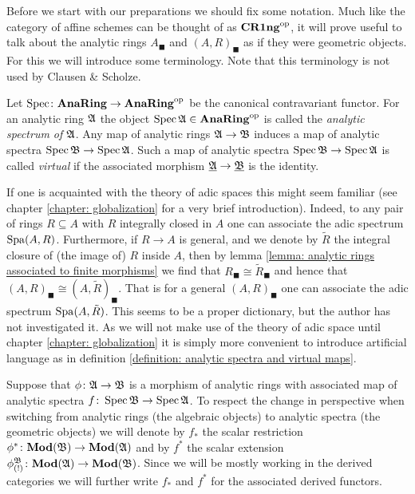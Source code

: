 Before we start with our preparations we should fix some notation. Much like the category of affine schemes can be thought of as ${\mathbf{CR1ng}}^{\mathrm{op}}$, it will prove useful to talk about the analytic rings $A_\blacksquare$ and $(A, R)_\blacksquare$ as if they were geometric objects. For this we will introduce some terminology. Note that this terminology is not used by Clausen \& Scholze.
\begin{definition}
	\label{definition: analytic spectra and virtual maps}
	
	Let $\operatorname{Spec}\colon {\mathbf{AnaRing}} \to {\mathbf{AnaRing}}^{\mathrm{op}}$ be the canonical contravariant functor. For an analytic ring ${\mathfrak{A}}$ the object $\operatorname{Spec} {\mathfrak{A}} \in {\mathbf{AnaRing}}^{\mathrm{op}}$ is called the \emph{analytic spectrum of ${\mathfrak{A}}$}. Any map of analytic rings ${\mathfrak{A}}\to {\mathfrak{B}}$ induces a map of analytic spectra $\operatorname{Spec}{\mathfrak{B}}\to \operatorname{Spec}{\mathfrak{A}}$. Such a map of analytic spectra $\operatorname{Spec} {\mathfrak{B}} \to \operatorname{Spec} {\mathfrak{A}}$ is called \emph{virtual} if the associated morphism ${\underline{{\mathfrak{A}}}}\to {\underline{{\mathfrak{B}}}}$ is the identity. 
\end{definition}

\begin{remark}
	If one is acquainted with the theory of adic spaces this might seem familiar (see chapter \ref{chapter: globalization} for a very brief introduction). Indeed, to any pair of rings $R\subseteq A$ with $R$ integrally closed in $A$ one can associate the adic spectrum $\operatorname{Spa}(A, R)$. Furthermore, if $R\to A$ is general, and we denote by $\tilde R$ the integral closure of (the image of) $R$ inside $A$, then by lemma \ref{lemma: analytic rings associated to finite morphisms} we find that $R_\blacksquare \cong \tilde R_\blacksquare$ and hence that $(A, R)_\blacksquare \cong (A, \tilde R)_\blacksquare$. That is for a general $(A, R)_\blacksquare$ one can associate the adic spectrum $\operatorname{Spa}(A, \tilde R)$. This seems to be a proper dictionary, but the author has not investigated it. As we will not make use of the theory of adic space until chapter \ref{chapter: globalization} it is simply more convenient to introduce artificial language as in definition \ref{definition: analytic spectra and virtual maps}.
\end{remark}

\begin{remark}[Notation]
	Suppose that $\phi\colon {\mathfrak{A}}\to {\mathfrak{B}}$ is a morphism of analytic rings with associated map of analytic spectra $f\colon \operatorname{Spec} {\mathfrak{B}} \to \operatorname{Spec}{\mathfrak{A}}$. To respect the change in perspective when switching from analytic rings (the algebraic objects) to analytic spectra (the geometric objects) we will denote by $f_\ast$ the scalar restriction ${\phi^\ast}\colon {{\mathbf{Mod}}({\mathfrak{B}})}\to{{\mathbf{Mod}}({\mathfrak{A}})}$ and by $f^\ast$ the scalar extension ${\phi_{(!)}^{{\mathfrak{B}}}}\colon {{\mathbf{Mod}}({\mathfrak{A}})}\to{{\mathbf{Mod}}({\mathfrak{B}})}$. Since we will be mostly working in the derived categories we will further write $f_\ast$ and $f^\ast$ for the associated derived functors. 
\end{remark}

